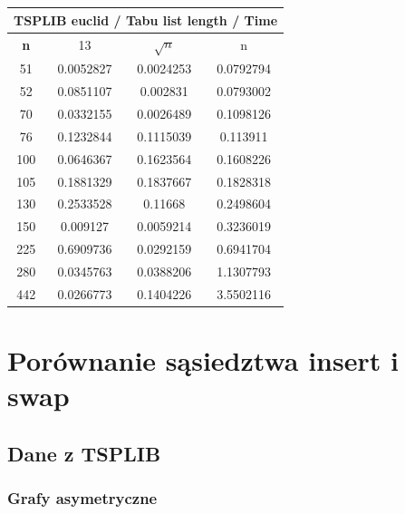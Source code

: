 \documentclass{article}
\begin{document}
\begin{center}
\begin{tabular}{|c|c|c|c|}
\hline
\multicolumn{4}{|c|}{\textbf{TSPLIB euclid / Tabu list length / Time}}\\
\hline
\textbf{n} & 13 & $\sqrt{n}$ & n\\
\hline
51 & 0.0052827 & 0.0024253 & 0.0792794\\
\hline
52 & 0.0851107 & 0.002831 & 0.0793002\\
\hline
70 & 0.0332155 & 0.0026489 & 0.1098126\\
\hline
76 & 0.1232844 & 0.1115039 & 0.113911\\
\hline
100 & 0.0646367 & 0.1623564 & 0.1608226\\
\hline
105 & 0.1881329 & 0.1837667 & 0.1828318\\
\hline
130 & 0.2533528 & 0.11668 & 0.2498604\\
\hline
150 & 0.009127 & 0.0059214 & 0.3236019\\
\hline
225 & 0.6909736 & 0.0292159 & 0.6941704\\
\hline
280 & 0.0345763 & 0.0388206 & 1.1307793\\
\hline
442 & 0.0266773 & 0.1404226 & 3.5502116\\
\hline
\end{tabular}
\end{center}



\section{Porównanie sąsiedztwa insert i swap}

\subsection{Dane z TSPLIB}

\subsubsection{Grafy asymetryczne}
\end{document}
